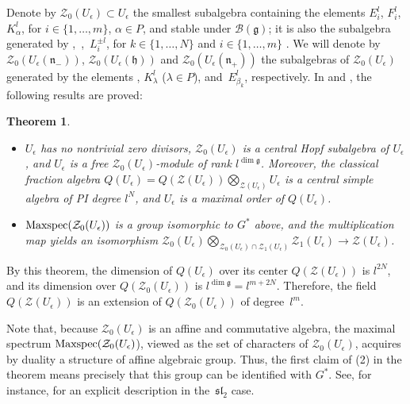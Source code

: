 \documentclass[pdftex]{sigma}
\numberwithin{equation}{section}
\newtheorem{teo}{Theorem}[section]
\theoremstyle{definition}
\newcommand{\e}{\epsilon}
\newcommand{\ra}{\rightarrow}
\begin{document}
Denote by $\mathcal{Z}_0(U_\e)\subset U_\e$ the smallest subalgebra containing the elements $E_i^l$, $F_i^l$, $K_\alpha^{l}$, for $i\in \{1,\dots,m\}$, $\alpha\in P$, and stable under $\mathcal{B}(\mathfrak{g})$; it is also the subalgebra generated by ,~,~$L_i^{\pm l}$, for $k\in \{1,\dots, N\}$ and $i\in \{1,\dots,m\}$ \cite[Section~18]{DC-K-P2}. We will denote by $\mathcal{Z}_0(U_\e(\mathfrak{n}_-))$, $\mathcal{Z}_0(U_\e(\mathfrak{h}))$ and $\mathcal{Z}_0(U_\e(\mathfrak{n}_+))$ the subalgebras of $\mathcal{Z}_0(U_\e)$ generated by the elements , $K_{\lambda}^l$ ($\lambda\in P$), and~$E_{\beta_k}^l$, respectively. In \cite[Sections~1.8, 3.3 and 3.8]{DC-K} and \cite[Theorem~14.1 and Sections~20--21]{DC-K-P2}, the following results are proved:

\begin{teo} \label{DCKteo1}\quad
\begin{itemize}\itemsep=0pt
\item[$(1)$] $U_\e$ has no nontrivial zero divisors, $\mathcal{Z}_0(U_\e)$ is a central Hopf subalgebra of $U_\e$, and $U_\e$ is a free $\mathcal{Z}_0(U_\e)$-module of rank $l^{\dim \mathfrak{g}}$. Moreover, the classical fraction algebra $Q(U_\e) = Q(\mathcal{Z}(U_\e))\bigotimes_{\mathcal{Z}(U_\e)} U_\e$ is a central simple algebra of PI degree $l^{N}$, and $U_\e$ is a maximal order of $Q(U_\e)$.
\item[$(2)$] ${\rm Maxspec}(\mathcal{Z}_0(U_\e))$ is a group isomorphic to $G^*$ above, and the multiplication map yields an isomorphism $\mathcal{Z}_0(U_\e)\bigotimes_{\mathcal{Z}_0(U_\e)\cap \mathcal{Z}_1(U_\e)} \mathcal{Z}_1(U_\e) \ra \mathcal{Z}(U_\e)$.
\end{itemize}
\end{teo}

By this theorem, the dimension of $Q(U_\e)$ over its center $Q(\mathcal{Z}(U_\e))$ is $l^{2N}$, and its dimension over $Q(\mathcal{Z}_0(U_\e))$ is $l^{\dim \mathfrak{g}} = l^{m+2N}$. Therefore, the field $Q(\mathcal{Z}(U_\e))$ is an extension of $Q(\mathcal{Z}_0(U_\e))$ of degree~$l^m$.

Note that, because $\mathcal{Z}_0(U_\e)$ is an affine and commutative algebra, the maximal spectrum ${\rm Maxspec}(\mathcal{Z}_0(U_\e)$), viewed as the set of characters of $\mathcal{Z}_0(U_\e)$, acquires by duality a structure of affine algebraic group. Thus, the first claim of (2) in the theorem means precisely that this group can be identified with $G^*$. See, for instance, \cite[Section~7.2.1]{BR} for an explicit description in the~${\mathfrak{sl}_2}$ case.
\end{document}
